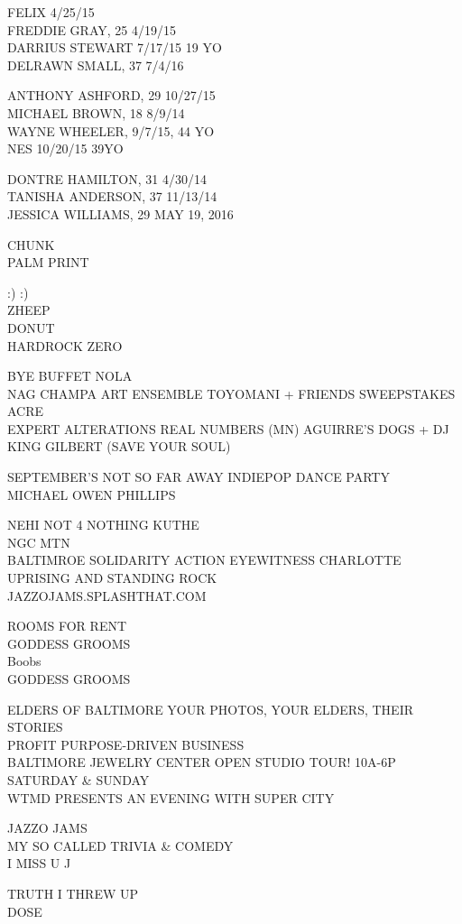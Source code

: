 \documentclass[10pt,letterpaper]{article}
\begin{document}
FELIX 4/25/15\\
FREDDIE GRAY, 25 4/19/15\\
DARRIUS STEWART 7/17/15 19 YO\\
DELRAWN SMALL, 37 7/4/16

ANTHONY ASHFORD, 29 10/27/15\\
MICHAEL BROWN, 18 8/9/14\\
WAYNE WHEELER, 9/7/15, 44 YO\\
NES 10/20/15 39YO

DONTRE HAMILTON, 31 4/30/14\\
TANISHA ANDERSON, 37 11/13/14\\
JESSICA WILLIAMS, 29 MAY 19, 2016

CHUNK\\
PALM PRINT

:) :)\\
ZHEEP\\
DONUT\\
HARDROCK ZERO

BYE BUFFET NOLA\\
NAG CHAMPA ART ENSEMBLE TOYOMANI + FRIENDS SWEEPSTAKES\\
ACRE\\
EXPERT ALTERATIONS REAL NUMBERS (MN) AGUIRRE'S DOGS + DJ KING GILBERT (SAVE YOUR SOUL)

SEPTEMBER'S NOT SO FAR AWAY INDIEPOP DANCE PARTY\\
MICHAEL OWEN PHILLIPS

NEHI NOT 4 NOTHING KUTHE\\
NGC MTN\\
BALTIMROE SOLIDARITY ACTION EYEWITNESS CHARLOTTE UPRISING AND STANDING ROCK\\
JAZZOJAMS.SPLASHTHAT.COM

ROOMS FOR RENT\\
GODDESS GROOMS\\
Boobs\\
GODDESS GROOMS

ELDERS OF BALTIMORE YOUR PHOTOS, YOUR ELDERS, THEIR STORIES\\
PROFIT PURPOSE{-}DRIVEN BUSINESS\\
BALTIMORE JEWELRY CENTER OPEN STUDIO TOUR!  10A{-}6P SATURDAY \& SUNDAY\\
WTMD PRESENTS AN EVENING WITH SUPER CITY

JAZZO JAMS\\
MY SO CALLED TRIVIA \& COMEDY\\
I MISS U J

TRUTH I THREW UP\\
DOSE
\end{document}
